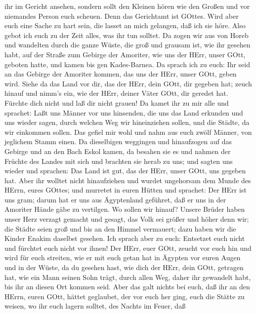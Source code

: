 ihr im Gericht ansehen, sondern sollt den Kleinen hören wie den Großen
und vor niemandes Person euch scheuen. Denn das Gerichtamt ist GOttes.
Wird aber euch eine Sache zu hart sein, die lasset an mich gelangen, daß
ich sie höre.  Also gebot ich euch zu der Zeit alles, was
ihr tun solltet.  Da zogen wir aus von Horeb und wandelten
durch die ganze Wüste, die groß und grausam ist, wie ihr gesehen habt,
auf der Straße zum Gebirge der Amoriter, wie uns der HErr, unser GOtt,
geboten hatte, und kamen bis gen Kades-Barnea.  Da sprach
ich zu euch: Ihr seid an das Gebirge der Amoriter kommen, das uns der
HErr, unser GOtt, geben wird.  Siehe da das Land vor dir,
das der HErr, dein GOtt, dir gegeben hat; zeuch hinauf und nimm's ein,
wie der HErr, deiner Väter GOtt, dir geredet hat. Fürchte dich nicht und
laß dir nicht grauen!  Da kamet ihr zu mir alle und
sprachet: Laßt uns Männer vor uns hinsenden, die uns das Land erkunden
und uns wieder sagen, durch welchen Weg wir hineinziehen sollen, und die
Städte, da wir einkommen sollen.  Das gefiel mir wohl und
nahm aus euch zwölf Männer, von jeglichem Stamm einen.  Da
dieselbigen weggingen und hinaufzogen auf das Gebirge und an den Bach
Eskol kamen, da besahen sie es  und nahmen der Früchte des
Landes mit sich und brachten sie herab zu uns; und sagten uns wieder und
sprachen: Das Land ist gut, das der HErr, unser GOtt, uns gegeben hat.
 Aber ihr wolltet nicht hinaufziehen und wurdet ungehorsam
dem Munde des HErrn, eures GOttes;  und murretet in euren
Hütten und sprachet: Der HErr ist uns gram; darum hat er uns aus
Ägyptenland geführet, daß er uns in der Amoriter Hände gäbe zu
vertilgen.  Wo sollen wir hinauf? Unsere Brüder haben unser
Herz verzagt gemacht und gesagt, das Volk sei größer und höher denn wir;
die Städte seien groß und bis an den Himmel vermauert; dazu haben wir
die Kinder Enakim daselbst gesehen.  Ich sprach aber zu
euch: Entsetzet euch nicht und fürchtet euch nicht vor ihnen!
 Der HErr, euer GOtt, zeucht vor euch hin und wird für euch
streiten, wie er mit euch getan hat in Ägypten vor euren Augen
 und in der Wüste, da du gesehen hast, wie dich der HErr,
dein GOtt, getragen hat, wie ein Mann seinen Sohn trägt, durch allen
Weg, daher ihr gewandelt habt, bis ihr an diesen Ort kommen seid.
 Aber das galt nichts bei euch, daß ihr an den HErrn, euren
GOtt, hättet geglaubet,  der vor euch her ging, euch die
Stätte zu weisen, wo ihr euch lagern solltet, des Nachts im Feuer, daß
